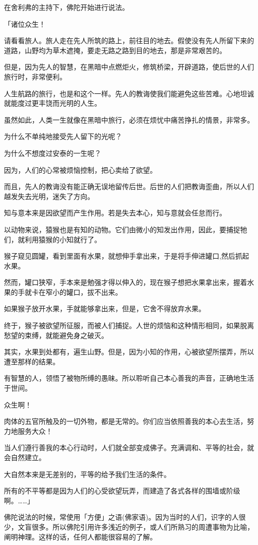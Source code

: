 \documentclass[twoside,openany]{book}
\begin{document}
在舍利弗的主持下，佛陀开始进行说法。

「诸位众生！

请看看旅人。旅人走在先人所筑的路上，前往目的地去。假使没有先人所留下来的道路，山野均为草木遮掩，要走无路之路到目的地去，那是非常艰苦的。

但是，因为先人的智慧，在黑暗中点燃炬火，修筑桥梁，开辟道路，使后世的人们旅行时，非常便利。

人生航路的旅行，也是和这个一样。先人的教诲使我们能避免这些苦难。心地坦诚就能度过更丰饶而光明的人生。

虽然如此，人类一生就像在黑暗中旅行，必须在烦忧中痛苦挣扎的情景，非常多。

为什么不单纯地接受先人留下的光呢？

为什么不想度过安泰的一生呢？

因为，人们的心常被烦恼控制，把心卖给了欲望。

而且，先人的教诲没有能正确无误地留传后世。后世的人们把教诲歪曲，所以人们越发失去光明，迷失了方向。

知与意本来是因欲望而产生作用。若是失去本心，知与意就会任怠而行。

以动物来说，猿猴也是有知的动物。它们由微小的知发出作用，因此，要捕捉牠们，就利用猿猴的小知就行了。

猴子窥见圆罐，看到里面有水果，就想伸手拿出来，于是将手伸进罐口,然后抓起水果。

然而，罐口狭窄，手本来是勉强才得以伸入的，现在猴子想把水果拿出来，握着水果的手就卡在窄小的罐口，拔不出来。

如果猴子放开水果，手就能够拿出来，但是，它舍不得放弃水果。

终于，猴子被欲望所征服，而被人们捕捉。人世的烦恼和这种情形相同，如果脱离愁望的束缚，就能避免身之破灭。

其实，水果到处都有，遍生山野。但是，因为小知的作用，心被欲望所摆弄，所以遭至那样的结果。

有智慧的人，领悟了被物所缚的愚昧。所以聆听自己本心善我的声音，正确地生活于世间。

众生啊！

肉体的五官所触及的一切外物，都是无常的。你们应当依照善我的本心去生活，努力地服务大众！

当人们遵行善我的本心行动时，人们就全部变成佛子。充满调和、平等的社会，就会自然建立。

大自然本来是无差别的，平等的给予我们生活的条件。

所有的不平等都是因为人们的心受欲望玩弄，而建造了各式各样的围墙或阶级啊。……」		

佛陀说法的时候，常使用「方便」之语(佛家语)。因为当时的人们，识字的人很少，文盲很多。所以佛陀引用许多浅近的例子，或人们所熟习的周遭事物为比喻，阐明神理。这样的话，任何人都能很容易的了解。
\end{document}
